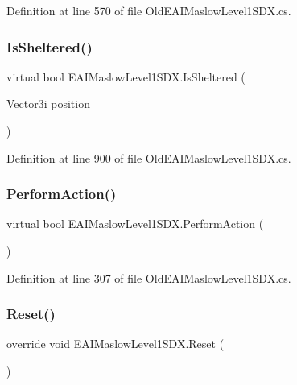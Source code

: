 Definition at line 570 of file Old\+E\+A\+I\+Maslow\+Level1\+S\+D\+X.\+cs.

\mbox{\label{class_e_a_i_maslow_level1_s_d_x_a0a00bab216154da1cadba2fd1c20d708}} 
\subsubsection{\texorpdfstring{IsSheltered()}{IsSheltered()}}
{\footnotesize\ttfamily virtual bool E\+A\+I\+Maslow\+Level1\+S\+D\+X.\+Is\+Sheltered (\begin{DoxyParamCaption}\item[{Vector3i}]{position }\end{DoxyParamCaption})\hspace{0.3cm}{\ttfamily [virtual]}}



Definition at line 900 of file Old\+E\+A\+I\+Maslow\+Level1\+S\+D\+X.\+cs.

\mbox{\label{class_e_a_i_maslow_level1_s_d_x_a8c398da905614892da7ef62cdc941094}} 
\subsubsection{\texorpdfstring{PerformAction()}{PerformAction()}}
{\footnotesize\ttfamily virtual bool E\+A\+I\+Maslow\+Level1\+S\+D\+X.\+Perform\+Action (\begin{DoxyParamCaption}{ }\end{DoxyParamCaption})\hspace{0.3cm}{\ttfamily [virtual]}}



Definition at line 307 of file Old\+E\+A\+I\+Maslow\+Level1\+S\+D\+X.\+cs.

\mbox{\label{class_e_a_i_maslow_level1_s_d_x_aa5a568c21b9165e495552070af6171e6}} 
\subsubsection{\texorpdfstring{Reset()}{Reset()}}
{\footnotesize\ttfamily override void E\+A\+I\+Maslow\+Level1\+S\+D\+X.\+Reset (\begin{DoxyParamCaption}{ }\end{DoxyParamCaption})}



